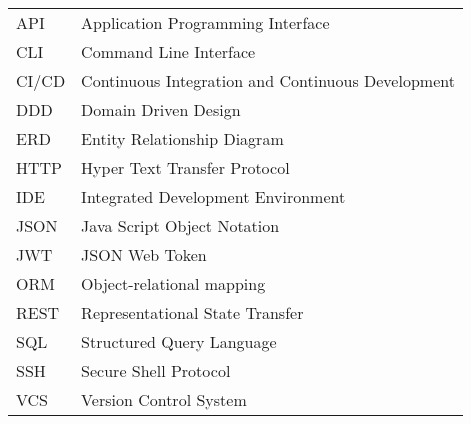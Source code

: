 \begin{longtable}{p{3cm}p{10cm}}
    API&Application Programming Interface\\
    CLI&Command Line Interface\\
    CI/CD&Continuous Integration and Continuous Development\\
    DDD&Domain Driven Design\\
    ERD&Entity Relationship Diagram\\
    HTTP&Hyper Text Transfer Protocol\\
    IDE&Integrated Development Environment\\
    JSON&Java Script Object Notation\\
    JWT&JSON Web Token\\
    ORM&Object-relational mapping\\
    REST&Representational State Transfer\\
    SQL&Structured Query Language\\
    SSH&Secure Shell Protocol\\
    VCS&Version Control System\\
\end{longtable}
\addtocounter{table}{-1}
